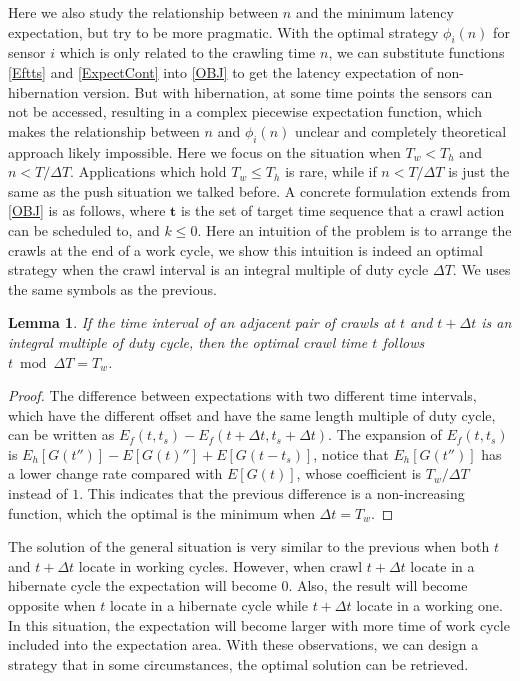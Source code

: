 \documentclass[conference]{IEEEtran}
\newtheorem{lemma}{Lemma}
\begin{document}
Here we also study the relationship between $n$ and the minimum latency expectation, but try to be more pragmatic.
With the optimal strategy $\phi_i(n)$ for sensor $i$ which is only related to the crawling time $n$, we can substitute functions \eqref{Eftts} and \eqref{ExpectCont} into \eqref{OBJ} to get the latency expectation of non-hibernation version. 
But with hibernation, at some time points the sensors can not be accessed, resulting in a complex piecewise expectation function, which makes the relationship between $n$ and $\phi_i(n)$ unclear and completely theoretical approach likely impossible.
Here we focus on the situation when $T_w<T_h$ and $n<T/\Delta T$. Applications which hold $T_w\leq T_h$ is rare, while if $n<T/\Delta T$ is just the same as the push situation we talked before.
A concrete formulation extends from \ref{OBJ} is as follows, where $\mathbf{t}$ is the set of target time sequence that a crawl action can be scheduled to, and $k\leq 0$.
Here an intuition of the problem is to arrange the crawls at the end of a work cycle, we show this intuition is indeed an optimal strategy when the crawl interval is an integral multiple of duty cycle $\Delta T$. We uses the same symbols as the previous.

\begin{lemma}
\label{intopt}
If the time interval of an adjacent pair of crawls at $t$ and $t+\Delta t$ is an integral multiple of duty cycle, then the optimal crawl time $t$ follows $t\bmod \Delta T=T_w$.
\end{lemma}

\begin{proof}
The difference between expectations with two different time intervals, which have the different offset and have the same length multiple of duty cycle, can be written as $E_f(t, t_s)-E_f(t+\Delta t, t_s+\Delta t)$. 
The expansion of $E_f(t,t_s)$ is $E_h[G(t'')]-E[G(t)'']+E[G(t-t_s)]$, notice that $E_h[G(t'')]$ has a lower change rate compared with $E[G(t)]$, whose coefficient is $T_w/\Delta T$ instead of $1$. This indicates that the previous difference is a non-increasing function, which the optimal is the minimum when $\Delta t =T_w$.
\end{proof}


The solution of the general situation is very similar to the previous when both $t$ and $t+\Delta t$ locate in working cycles. However, when crawl $t+\Delta t$  locate in a hibernate cycle the expectation will become $0$. Also, the result will become opposite when $t$ locate in a hibernate cycle while $t+\Delta t$ locate in a working one. In this situation, the expectation will become larger with more time of work cycle included into the expectation area. 
With these observations, we can design a strategy that in some circumstances, the optimal solution can be retrieved.
\end{document}
